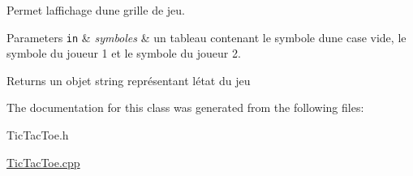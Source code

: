 Permet l\textquotesingle{}affichage d\textquotesingle{}une grille de jeu. 
\begin{DoxyParams}[1]{Parameters}
\mbox{\tt in}  & {\em symboles} & un tableau contenant le symbole d\textquotesingle{}une case vide, le symbole du joueur 1 et le symbole du joueur 2. \\
\hline
\end{DoxyParams}
\begin{DoxyReturn}{Returns}
un objet string représentant l\textquotesingle{}état du jeu 
\end{DoxyReturn}


The documentation for this class was generated from the following files\+:\begin{DoxyCompactItemize}
\item 
Tic\+Tac\+Toe.\+h\item 
\hyperlink{TicTacToe_8cpp}{Tic\+Tac\+Toe.\+cpp}\end{DoxyCompactItemize}
